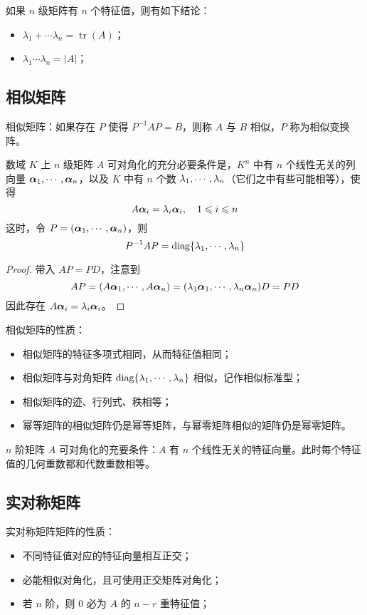 如果 $n$ 级矩阵有 $n$ 个特征值，则有如下结论：
\begin{itemize}
	\item $\lambda_1 + \cdots \lambda_n = \operatorname{tr}(A)$；
	\item $\lambda_1 \cdots \lambda_n = |A|$；
\end{itemize}

\subsection{相似矩阵}

相似矩阵：如果存在 $P$ 使得 $P^{-1} A P = B$，则称 $A$ 与 $B$ 相似，$P$ 称为相似变换阵。

\begin{theorem}
	数域 $K$ 上 $n$ 级矩阵 $A$ 可对角化的充分必要条件是，$K^n$ 中有 $n$ 个线性无关的列向量 $\boldsymbol{\alpha}_1,\cdots,\boldsymbol{\alpha}_n$，以及 $K$ 中有 $n$ 个数 $\lambda_1,\cdots,\lambda_n$（它们之中有些可能相等），使得
	\[ A\boldsymbol{\alpha}_i = \lambda_i \boldsymbol{\alpha}_i, \quad  1 \leqslant i \leqslant n \]
	这时，令 $P = (\boldsymbol{\alpha}_1,\cdots,\boldsymbol{\alpha}_n)$，则
	\[ P^{-1}AP = \operatorname{diag} \{\lambda_1,\cdots,\lambda_n\} \]
\end{theorem}

\begin{proof}
	带入 $AP = PD$，注意到
	\[ AP = (A\boldsymbol{\alpha}_1,\cdots,A\boldsymbol{\alpha}_n) = (\lambda_1 \boldsymbol{\alpha}_1, \cdots, \lambda_n \boldsymbol{\alpha}_n)D = PD \]
	因此存在 $A \boldsymbol{\alpha}_i = \lambda_i \boldsymbol{\alpha}_i$。
\end{proof}

相似矩阵的性质：
\begin{itemize}
	\item 相似矩阵的特征多项式相同，从而特征值相同；
	\item 相似矩阵与对角矩阵 $\operatorname{diag}\{\lambda_1,\cdots,\lambda_n\}$ 相似，记作相似标准型；
	\item 相似矩阵的迹、行列式、秩相等；
	\item 幂等矩阵的相似矩阵仍是幂等矩阵，与幂零矩阵相似的矩阵仍是幂零矩阵。
\end{itemize}

$n$ 阶矩阵 $A$ 可对角化的充要条件：$A$ 有 $n$ 个线性无关的特征向量。此时每个特征值的几何重数都和代数重数相等。

\subsection{实对称矩阵}

实对称矩阵矩阵的性质：
\begin{itemize}
	\item 不同特征值对应的特征向量相互正交；
	\item 必能相似对角化，且可使用正交矩阵对角化；
	\item 若 $n$ 阶，则 $0$ 必为 $A$ 的 $n-r$ 重特征值；
\end{itemize}

